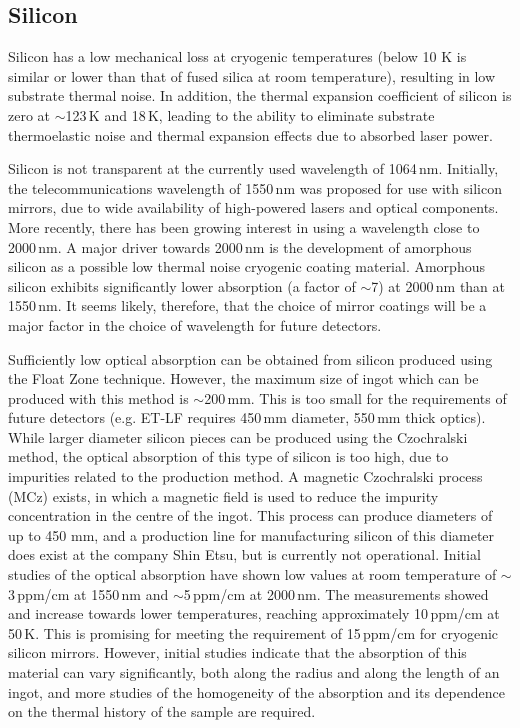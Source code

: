 \subsection{Silicon}
Silicon has a low mechanical loss at cryogenic temperatures (below 10 K is similar or lower than that of fused silica at room temperature), resulting in low substrate thermal noise. In addition, the thermal expansion coefficient of silicon is zero at $\sim$123\,K and 18\,K, leading to the ability to eliminate substrate thermoelastic noise and thermal expansion effects due to absorbed laser power.

Silicon is not transparent at the currently used wavelength of 1064\,nm. Initially, the telecommunications wavelength of 1550\,nm was proposed for use with silicon mirrors, due to wide availability of high-powered lasers and optical components. More recently, there has been growing interest in using a wavelength close to 2000\,nm. A major driver towards 2000\,nm is the development of amorphous silicon as a possible low thermal noise cryogenic coating material. Amorphous silicon exhibits significantly lower absorption (a factor of $\sim$7) at 2000\,nm than at 1550\,nm. It seems likely, therefore, that the choice of mirror coatings will be a major factor in the choice of wavelength for future detectors. 

Sufficiently low optical absorption can be obtained from silicon produced using the Float Zone technique. However, the maximum size of ingot which can be produced with this method is $\sim$200\,mm. This is too small for the requirements of future detectors (e.g. ET-LF requires 450\,mm diameter, 550\,mm thick optics). While larger diameter silicon pieces can be produced using the Czochralski method, the optical absorption of this type of silicon is too high, due to impurities related to the production method. A magnetic Czochralski process (MCz) exists, in which a magnetic field is used to reduce the impurity concentration in the centre of the ingot. This process can produce diameters of up to 450 mm, and a production line for manufacturing silicon of this diameter does exist at the company Shin Etsu, but is currently not operational. Initial studies of the optical absorption have shown low values at room temperature of $\sim$3\,ppm/cm at 1550\,nm and $\sim$5\,ppm/cm at 2000\,nm. The measurements showed and increase towards lower temperatures, reaching approximately 10\,ppm/cm at 50\,K. This is promising for meeting the requirement of 15\,ppm/cm for cryogenic silicon mirrors. However, initial studies indicate that the absorption of this material can vary significantly, both along the radius and along the length of an ingot, and more studies of the homogeneity of the absorption and its dependence on the thermal history of the sample are required. 

